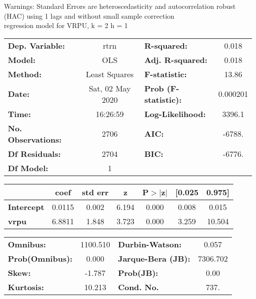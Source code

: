 Warnings: \newline
 [1] Standard Errors are heteroscedasticity and autocorrelation robust (HAC) using 1 lags and without small sample correction\\ 

regression model for VRPU, k = 2 h = 1\begin{center}
\begin{tabular}{lclc}
\toprule
\textbf{Dep. Variable:}    &       rtrn       & \textbf{  R-squared:         } &     0.018   \\
\textbf{Model:}            &       OLS        & \textbf{  Adj. R-squared:    } &     0.018   \\
\textbf{Method:}           &  Least Squares   & \textbf{  F-statistic:       } &     13.86   \\
\textbf{Date:}             & Sat, 02 May 2020 & \textbf{  Prob (F-statistic):} &  0.000201   \\
\textbf{Time:}             &     16:26:59     & \textbf{  Log-Likelihood:    } &    3396.1   \\
\textbf{No. Observations:} &        2706      & \textbf{  AIC:               } &    -6788.   \\
\textbf{Df Residuals:}     &        2704      & \textbf{  BIC:               } &    -6776.   \\
\textbf{Df Model:}         &           1      & \textbf{                     } &             \\
\bottomrule
\end{tabular}
\begin{tabular}{lcccccc}
                   & \textbf{coef} & \textbf{std err} & \textbf{z} & \textbf{P$> |$z$|$} & \textbf{[0.025} & \textbf{0.975]}  \\
\midrule
\textbf{Intercept} &       0.0115  &        0.002     &     6.194  &         0.000        &        0.008    &        0.015     \\
\textbf{vrpu}      &       6.8811  &        1.848     &     3.723  &         0.000        &        3.259    &       10.504     \\
\bottomrule
\end{tabular}
\begin{tabular}{lclc}
\textbf{Omnibus:}       & 1100.510 & \textbf{  Durbin-Watson:     } &    0.057  \\
\textbf{Prob(Omnibus):} &   0.000  & \textbf{  Jarque-Bera (JB):  } & 7306.702  \\
\textbf{Skew:}          &  -1.787  & \textbf{  Prob(JB):          } &     0.00  \\
\textbf{Kurtosis:}      &  10.213  & \textbf{  Cond. No.          } &     737.  \\
\bottomrule
\end{tabular}
\end{center}

